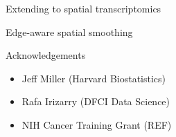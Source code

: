 \documentclass[aspectratio=43]{beamer}
\begin{document}
\begin{frame}{Extending to spatial transcriptomics}

\end{frame}

\begin{frame}{Edge-aware spatial smoothing}

\end{frame}

\begin{frame}{Acknowledgements}
\begin{itemize}
\item Jeff Miller (Harvard Biostatistics)
\item Rafa Irizarry (DFCI Data Science)
\item NIH Cancer Training Grant (REF) 
\end{itemize}
\end{frame}
\end{document}
